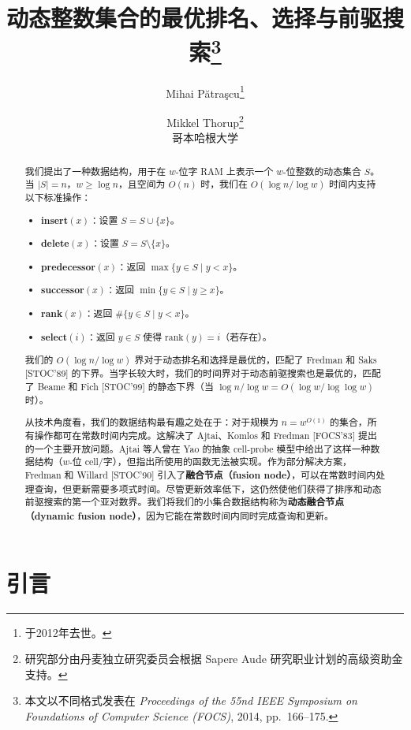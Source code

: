 \documentclass[11pt,a4paper]{ctexart}
\title{动态整数集合的最优排名、选择与前驱搜索\thanks{本文以不同格式发表在 {\em Proceedings of the 55nd IEEE Symposium on Foundations of Computer Science (FOCS)}, 2014, pp.~166--175.}}
\author{%
Mihai P\u{a}tra\c{s}cu\thanks{于2012年去世。}%
\and
Mikkel Thorup\thanks{研究部分由丹麦独立研究委员会根据 Sapere Aude 研究职业计划的高级资助金支持。}\\[2ex]
哥本哈根大学%
}
\date{}
\newcommand{\RANKOP}{\text{rank}}
\begin{document}
\maketitle

\begin{abstract}
我们提出了一种数据结构，用于在 $w$-位字 RAM 上表示一个 $w$-位整数的动态集合 $S$。当 $|S|=n$，$w \geq \log n$，且空间为 $O(n)$ 时，我们在 $O(\log n / \log w)$ 时间内支持以下标准操作：
\begin{itemize}
\item \textbf{insert}$(x)$：设置 $S = S \cup \{x\}$。
\item \textbf{delete}$(x)$：设置 $S = S \setminus \{x\}$。
\item \textbf{predecessor}$(x)$：返回 $\max\{y \in S \mid y < x\}$。
\item \textbf{successor}$(x)$：返回 $\min\{y \in S \mid y \geq x\}$。
\item \textbf{rank}$(x)$：返回 $\#\{y \in S \mid y < x\}$。
\item \textbf{select}$(i)$：返回 $y \in S$ 使得 $\RANKOP(y)=i$（若存在）。
\end{itemize}
我们的 $O(\log n / \log w)$ 界对于动态排名和选择是最优的，匹配了 Fredman 和 Saks [STOC'89] 的下界。当字长较大时，我们的时间界对于动态前驱搜索也是最优的，匹配了 Beame 和 Fich [STOC'99] 的静态下界（当 $\log n / \log w = O(\log w / \log\log w)$ 时）。

从技术角度看，我们的数据结构最有趣之处在于：对于规模为 $n = w^{O(1)}$ 的集合，所有操作都可在常数时间内完成。这解决了 Ajtai、Komlos 和 Fredman [FOCS'83] 提出的一个主要开放问题。Ajtai 等人曾在 Yao 的抽象 cell-probe 模型中给出了这样一种数据结构（$w$-位 cell/字），但指出所使用的函数无法被实现。作为部分解决方案，Fredman 和 Willard [STOC'90] 引入了\textbf{融合节点（fusion node）}，可以在常数时间内处理查询，但更新需要多项式时间。尽管更新效率低下，这仍然使他们获得了排序和动态前驱搜索的第一个亚对数界。我们将我们的小集合数据结构称为\textbf{动态融合节点（dynamic fusion node）}，因为它能在常数时间内同时完成查询和更新。
\end{abstract}

\section{引言}
\end{document}
